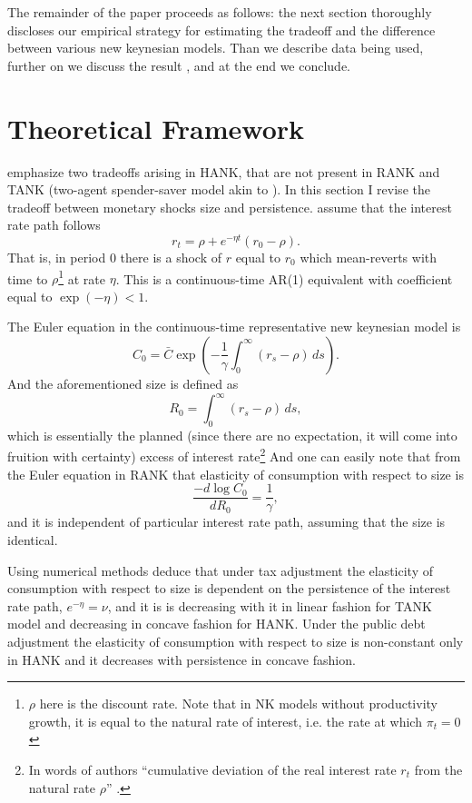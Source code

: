 \documentclass[12pt]{article}
\numberwithin{equation}{section}
\begin{document}
The remainder of the paper proceeds as follows: 
the next section thoroughly discloses our empirical strategy for estimating the tradeoff and the difference between various new keynesian models.
Than we describe data being used, further on we discuss the result , and at the end we conclude.

\section{Theoretical Framework}

\citet{KMV2018} emphasize two tradeoffs arising in HANK, that are not present in RANK and TANK (two-agent spender-saver model akin to \citet{Campbell1989}). In this section I revise the tradeoff between monetary shocks size and persistence. \citet{KMV2018} assume that the interest rate path follows 
\begin{equation}
    r_t=\rho+e^{-\eta t}(r_0-\rho).\label{eq:InterestRatePath}
\end{equation}
That is, in period $0$ there is a shock of $r$ equal to $r_0$ which mean-reverts with time to $\rho$\footnote{$\rho$ here is the discount rate. Note that in NK models without productivity growth, it is equal to the natural rate of interest, i.e. the rate at which $\pi_t=0$} at rate $\eta$. This is a continuous-time AR(1) equivalent with coefficient equal to $\exp(-\eta)<1$.

The Euler equation in the continuous-time representative new keynesian model is 
\[C_0=\bar C\exp\left(-\frac{1}{\gamma}\int_0^\infty \left(r_s-\rho\right)\,ds\right).\]
And the aforementioned size is defined as 
\begin{equation}
    R_0=\int_0^\infty \left(r_s-\rho\right)\,ds,\label{eq:KMVsize}
\end{equation}
which is essentially the planned (since there are no expectation, it will come into fruition with certainty) excess of interest rate\footnote{In words of authors ``cumulative deviation of the real interest rate $r_t$ from the natural rate $\rho$'' \citep{KMV2018}.} And one can easily note that from the Euler equation in RANK that elasticity of consumption with respect to size is 
\[\frac{-d \log C_0}{dR_0}=\frac{1}{\gamma},\]
and it is independent of particular interest rate path, assuming that the size is identical. 

Using numerical methods \citet{KMV2018} deduce that under tax adjustment the elasticity of consumption with respect to size is dependent on the persistence of the interest rate path, $e^{-\eta}=\nu$, and it is is decreasing with it in linear fashion for TANK model and decreasing in concave fashion for HANK. Under the public debt adjustment the elasticity of consumption with respect to size is non-constant only in HANK and it decreases with persistence in concave fashion.
\end{document}
